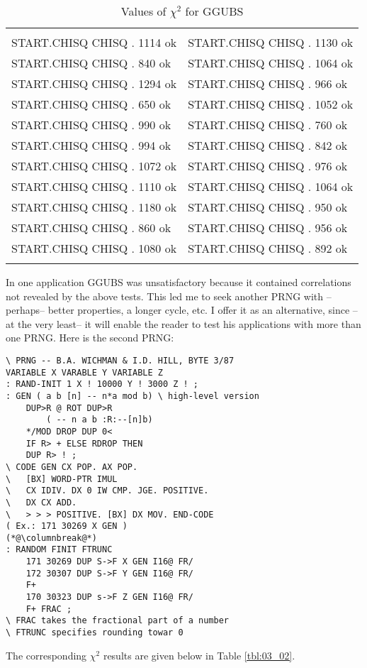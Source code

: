 \begin{table}
    \caption{Values of $\chi^2$ for GGUBS}
    \label{tbl:03_01}
        \setlength{\tabcolsep}{20pt}
        \begin{tabular}{|ll|}
            \hline & \\
            START.CHISQ CHISQ . 1114 ok &  START.CHISQ CHISQ . 1130 ok \\ 
            START.CHISQ CHISQ . 840 ok  &  START.CHISQ CHISQ . 1064 ok \\
            START.CHISQ CHISQ . 1294 ok &  START.CHISQ CHISQ . 966 ok  \\
            START.CHISQ CHISQ . 650 ok  &  START.CHISQ CHISQ . 1052 ok \\
            START.CHISQ CHISQ . 990 ok  &  START.CHISQ CHISQ . 760 ok  \\
            START.CHISQ CHISQ . 994 ok  &  START.CHISQ CHISQ . 842 ok  \\
            START.CHISQ CHISQ . 1072 ok &  START.CHISQ CHISQ . 976 ok  \\
            START.CHISQ CHISQ . 1110 ok &  START.CHISQ CHISQ . 1064 ok \\
            START.CHISQ CHISQ . 1180 ok &  START.CHISQ CHISQ . 950 ok  \\
            START.CHISQ CHISQ . 860 ok  &  START.CHISQ CHISQ . 956 ok  \\
            START.CHISQ CHISQ . 1080 ok &  START.CHISQ CHISQ . 892 ok  \\
            & \\
            \hline
        \end{tabular} 
\end{table}

In one application GGUBS was unsatisfactory because it contained correlations
not revealed by the above tests. This led me
to seek another PRNG with --perhaps-- better properties, a
longer cycle, etc. I offer it as an alternative, since --at the very
least-- it will enable the reader to test his applications with more
than one PRNG. Here is the second PRNG:

\begin{multicols}{2}
\setlength{\columnsep}{1.5cm}
\setlength{\columnseprule}{0.2pt}
\tiny
\begin{lstlisting}
\ PRNG -- B.A. WICHMAN & I.D. HILL, BYTE 3/87
VARIABLE X VARABLE Y VARIABLE Z
: RAND-INIT 1 X ! 10000 Y ! 3000 Z ! ;
: GEN ( a b [n] -- n*a mod b) \ high-level version
    DUP>R @ ROT DUP>R
        ( -- n a b :R:--[n]b)
    */MOD DROP DUP 0<
    IF R> + ELSE RDROP THEN
    DUP R> ! ;
\ CODE GEN CX POP. AX POP.
\   [BX] WORD-PTR IMUL
\   CX IDIV. DX 0 IW CMP. JGE. POSITIVE.
\   DX CX ADD.
\   > > > POSITIVE. [BX] DX MOV. END-CODE
( Ex.: 171 30269 X GEN )
(*@\columnbreak@*)
: RANDOM FINIT FTRUNC
    171 30269 DUP S->F X GEN I16@ FR/
    172 30307 DUP S->F Y GEN I16@ FR/
    F+
    170 30323 DUP s->F Z GEN I16@ FR/
    F+ FRAC ;
\ FRAC takes the fractional part of a number 
\ FTRUNC specifies rounding towar 0
\end{lstlisting}
\end{multicols}
The corresponding $\chi^2$ results are given below in Table \ref{tbl:03_02}. %

